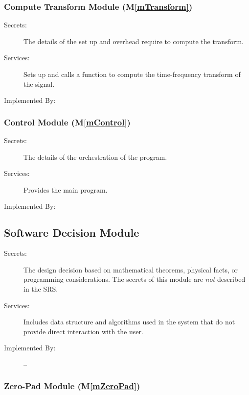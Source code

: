 \documentclass[12pt, titlepage]{article}
\newcommand{\mref}[1]{M\ref{#1}}
\begin{document}
\subsubsection{Compute Transform Module (\mref{mTransform})}

\begin{description}
\item[Secrets:]The details of the set up and overhead require to compute the transform.
\item[Services:]Sets up and calls a function to compute the time-frequency transform of the signal.
\item[Implemented By:] \progname{}
\end{description}


\subsubsection{Control Module (\mref{mControl})}

\begin{description}
\item[Secrets:]The details of the orchestration of the program.
\item[Services:]Provides the main program.
\item[Implemented By:] \progname{}
\end{description}

\subsection{Software Decision Module}

\begin{description}
\item[Secrets:] The design decision based on mathematical theorems, physical
  facts, or programming considerations. The secrets of this module are
  \emph{not} described in the SRS.
\item[Services:] Includes data structure and algorithms used in the system that
  do not provide direct interaction with the user. 
\item[Implemented By:] --
\end{description}

\subsubsection{Zero-Pad Module (\mref{mZeroPad})}
\end{document}
